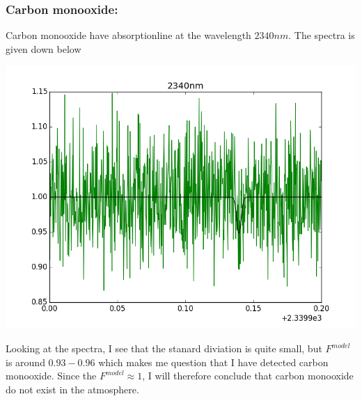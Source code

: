 \documentclass[a4paper,11pt,english]{report}
\begin{document}
\subsubsection{Carbon monooxide:} Carbon monooxide have absorptionline at the
wavelength \(2340nm\). The spectra is given down below
\begin{center}
  \includegraphics[scale = 0.4]{2340nm.png}
\end{center}
\newpage
Looking at the spectra, I see that the stanard diviation is quite small, but
\(F^{model}\) is around \(0.93-0.96\) which makes me question that I have
detected carbon monooxide. Since the \(F^{model} \approx 1\), I will therefore
conclude that carbon monooxide do not exist in the atmosphere.
\end{document}
